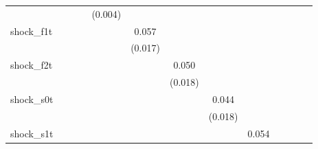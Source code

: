 {\begin{tabular}{l*{12}{c}}
            &                     &                     &                     &     (0.004)         &                     &                     &                     &                     &                     &                     &                     &                     \\
\addlinespace
shock\_f1t   &                     &                     &                     &                     &       0.057\sym{***}&                     &                     &                     &                     &                     &                     &                     \\
            &                     &                     &                     &                     &     (0.017)         &                     &                     &                     &                     &                     &                     &                     \\
\addlinespace
shock\_f2t   &                     &                     &                     &                     &                     &       0.050\sym{**} &                     &                     &                     &                     &                     &                     \\
            &                     &                     &                     &                     &                     &     (0.018)         &                     &                     &                     &                     &                     &                     \\
\addlinespace
shock\_s0t   &                     &                     &                     &                     &                     &                     &       0.044\sym{**} &                     &                     &                     &                     &                     \\
            &                     &                     &                     &                     &                     &                     &     (0.018)         &                     &                     &                     &                     &                     \\
\addlinespace
shock\_s1t   &                     &                     &                     &                     &                     &                     &                     &       0.054\sym{***}&                     &                     &                     &                     \\

\end{tabular}}
